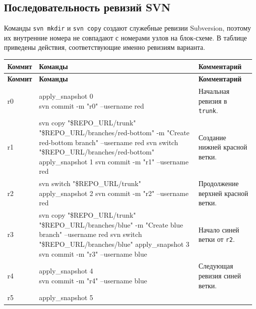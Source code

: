 \documentclass[12pt]{article}
\newcommand{\cmdcell}[1]{\parbox[t]{\linewidth}{\ttfamily\small\raggedright\strut #1\strut}}
\begin{document}
\subsection{Последовательность ревизий SVN}

Команды \texttt{svn mkdir} и \texttt{svn copy} создают служебные ревизии
Subversion, поэтому их внутренние номера не совпадают с номерами узлов
на блок-схеме. В таблице приведены действия, соответствующие именно
ревизиям варианта.

\begin{xltabular}{\linewidth}{|L{0.10\textwidth}|K|M|}
\hline
{}
\textbf{Коммит} & \textbf{Команды} & \textbf{Комментарий} \\
\hline
\endfirsthead
\hline
{}
\textbf{Коммит} & \textbf{Команды} & \textbf{Комментарий} \\
\hline
\endhead
r0 &
\cmdcell{apply\_snapshot 0\\
svn commit -m "r0" --username red} &
Начальная ревизия в \texttt{trunk}. \\
\hline
r1 &
\cmdcell{svn copy "\$REPO\_URL/trunk"\\
"\$REPO\_URL/branches/red-bottom"\\
-m "Create red-bottom branch" --username red\\
svn switch "\$REPO\_URL/branches/red-bottom"\\
apply\_snapshot 1\\
svn commit -m "r1" --username red} &
Создание нижней красной ветки. \\
\hline
r2 &
\cmdcell{svn switch "\$REPO\_URL/trunk"\\
apply\_snapshot 2\\
svn commit -m "r2" --username red} &
Продолжение верхней красной ветки. \\
\hline
r3 &
\cmdcell{svn copy "\$REPO\_URL/trunk"\\
"\$REPO\_URL/branches/blue"\\
-m "Create blue branch" --username red\\
svn switch "\$REPO\_URL/branches/blue"\\
apply\_snapshot 3\\
svn commit -m "r3" --username blue} &
Начало синей ветки от \texttt{r2}. \\
\hline
r4 &
\cmdcell{apply\_snapshot 4\\
svn commit -m "r4" --username blue} &
Следующая ревизия синей ветки. \\
\hline
r5 &
\cmdcell{apply\_snapshot 5\\
}
\end{xltabular}
\end{document}
